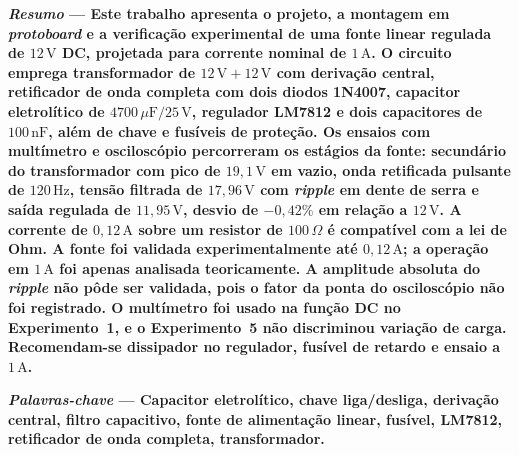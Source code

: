 \providecommand{\pendente}[1]{\textcolor{red}{[PENDENTE: #1]}}

{
\small\sffamily\selectfont
\textbf{\textit{Resumo} --- Este trabalho apresenta o projeto, a montagem em \textit{protoboard} e a verificação experimental de uma fonte linear regulada de $12\,\text{V}$ DC, projetada para corrente nominal de $1\,\text{A}$. O circuito emprega transformador de $12\,\text{V}+12\,\text{V}$ com derivação central, retificador de onda completa com dois diodos 1N4007, capacitor eletrolítico de $4700\,\mu\text{F} / 25\,\text{V}$, regulador LM7812 e dois capacitores de $100\,\text{nF}$, além de chave e fusíveis de proteção. Os ensaios com multímetro e osciloscópio percorreram os estágios da fonte: secundário do transformador com pico de $19{,}1\,\text{V}$ em vazio, onda retificada pulsante de $120\,\text{Hz}$, tensão filtrada de $17{,}96\,\text{V}$ com \textit{ripple} em dente de serra e saída regulada de $11{,}95\,\text{V}$, desvio de $-0{,}42\%$ em relação a $12\,\text{V}$. A corrente de $0{,}12\,\text{A}$ sobre um resistor de $100\,\Omega$ é compatível com a lei de Ohm. A fonte foi validada experimentalmente até $0{,}12\,\text{A}$; a operação em $1\,\text{A}$ foi apenas analisada teoricamente. A amplitude absoluta do \textit{ripple} não pôde ser validada, pois o fator da ponta do osciloscópio não foi registrado. O multímetro foi usado na função DC no Experimento~1, e o Experimento~5 não discriminou variação de carga. Recomendam-se dissipador no regulador, fusível de retardo e ensaio a $1\,\text{A}$.}

\textbf{\textit{Palavras-chave} --- Capacitor eletrolítico, chave liga/desliga, derivação central, filtro capacitivo, fonte de alimentação linear, fusível, LM7812, retificador de onda completa, transformador.}
}

\vspace{1em}


